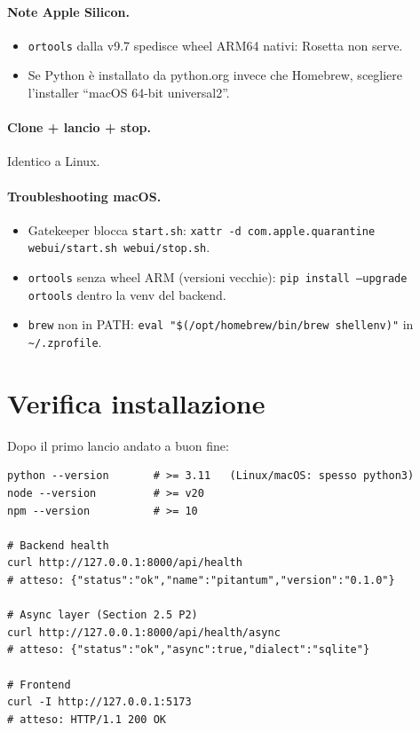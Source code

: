 \paragraph{Note Apple Silicon.}
\begin{itemize}
  \item \texttt{ortools} dalla v9.7 spedisce wheel ARM64 nativi:
        Rosetta non serve.
  \item Se Python \`e installato da python.org invece che Homebrew,
        scegliere l'installer ``macOS 64-bit universal2''.
\end{itemize}

\paragraph{Clone + lancio + stop.} Identico a Linux.

\paragraph{Troubleshooting macOS.}
\begin{itemize}
  \item Gatekeeper blocca \texttt{start.sh}:
        \texttt{xattr -d com.apple.quarantine webui/start.sh
        webui/stop.sh}.
  \item \texttt{ortools} senza wheel ARM (versioni vecchie):
        \texttt{pip install --upgrade ortools} dentro la venv del
        backend.
  \item \texttt{brew} non in PATH:
        \texttt{eval "\$(/opt/homebrew/bin/brew shellenv)"} in
        \texttt{\textasciitilde/.zprofile}.
\end{itemize}

\section{Verifica installazione}

Dopo il primo lancio andato a buon fine:

\begin{lstlisting}[style=shell]
python --version       # >= 3.11   (Linux/macOS: spesso python3)
node --version         # >= v20
npm --version          # >= 10

# Backend health
curl http://127.0.0.1:8000/api/health
# atteso: {"status":"ok","name":"pitantum","version":"0.1.0"}

# Async layer (Section 2.5 P2)
curl http://127.0.0.1:8000/api/health/async
# atteso: {"status":"ok","async":true,"dialect":"sqlite"}

# Frontend
curl -I http://127.0.0.1:5173
# atteso: HTTP/1.1 200 OK
\end{lstlisting}

